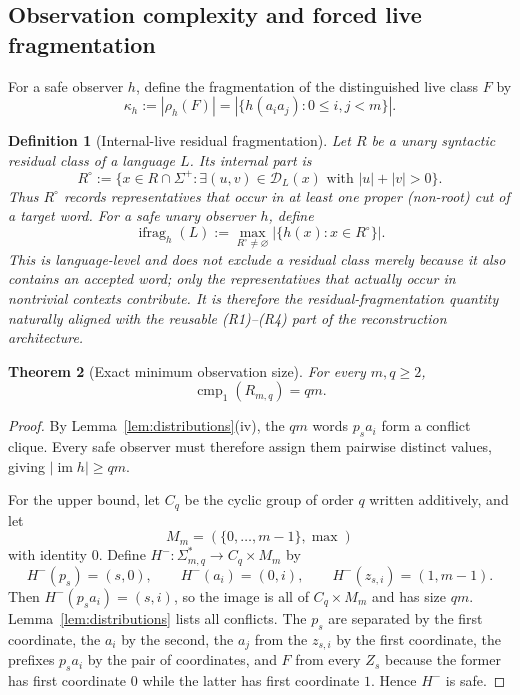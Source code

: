 \documentclass[11pt]{article}
\newtheorem{definition}{Definition}[section]
\newtheorem{theorem}[definition]{Theorem}
\newcommand{\D}{\mathcal D}
\newcommand{\im}{\operatorname{im}}
\newcommand{\cmp}{\operatorname{cmp}}
\newcommand{\ifrag}{\operatorname{ifrag}}
\begin{document}
\subsection{Observation complexity and forced live fragmentation}

For a safe observer $h$, define the fragmentation of the distinguished live
class $F$ by
\[
 \kappa_h
 :=
 |\rho_h(F)|
 =
 |\{h(a_i a_j):0\le i,j<m\}|.
\]


\begin{definition}[Internal-live residual fragmentation]
\label{def:ifrag}
Let $R$ be a unary syntactic residual class of a language $L$.  Its
\emph{internal part} is
\[
 R^{\circ}
 :=
 \{x\in R\cap\Sigma^+ :
    \exists(u,v)\in\D_L(x)\text{ with }|u|+|v|>0\}.
\]
Thus $R^{\circ}$ records representatives that occur in at least one proper
(non-root) cut of a target word.  For a safe unary observer $h$, define
\[
 \ifrag_h(L)
 :=
 \max_{R^{\circ}\ne\varnothing}
 \bigl|\{h(x):x\in R^{\circ}\}\bigr|.
\]
This is language-level and does not exclude a residual class merely because it
also contains an accepted word; only the representatives that actually occur
in nontrivial contexts contribute.  It is therefore the residual-fragmentation
quantity naturally aligned with the reusable (R1)--(R4) part of the
reconstruction architecture.
\end{definition}


\begin{theorem}[Exact minimum observation size]
\label{thm:cmp}
For every $m,q\ge2$,
\[
 \cmp_1(R_{m,q})=qm.
\]
\end{theorem}

\begin{proof}
By Lemma~\ref{lem:distributions}(iv), the $qm$ words $p_sa_i$ form a
conflict clique.  Every safe observer must therefore assign them pairwise
distinct values, giving $|\im h|\ge qm$.

For the upper bound, let $C_q$ be the cyclic group of order $q$ written
additively, and let
\[
 M_m=(\{0,\ldots,m-1\},\max)
\]
with identity $0$.  Define $H^-:\Sigma_{m,q}^*\to C_q\times M_m$ by
\[
 H^-(p_s)=(s,0),\qquad
 H^-(a_i)=(0,i),\qquad
 H^-(z_{s,i})=(1,m-1).
\]
Then $H^-(p_sa_i)=(s,i)$, so the image is all of $C_q\times M_m$ and has
size $qm$.  Lemma~\ref{lem:distributions} lists all conflicts.  The $p_s$ are
separated by the first coordinate, the $a_i$ by the second, the $a_j$ from
the $z_{s,i}$ by the first coordinate, the prefixes $p_sa_i$ by the pair of
coordinates, and $F$ from every $Z_s$ because the former has first coordinate
$0$ while the latter has first coordinate $1$.  Hence $H^-$ is safe.
\end{proof}
\end{document}

